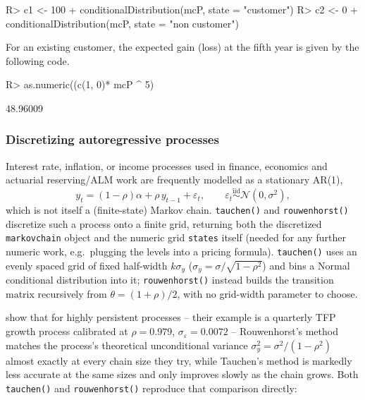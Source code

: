 \documentclass[
  nojss]{jss}
\begin{document}
\begin{CodeChunk}
\begin{CodeInput}
R> c1 <- 100 + conditionalDistribution(mcP, state = "customer") %
R> c2 <- 0 + conditionalDistribution(mcP, state = "non customer") %
\end{CodeInput}
\end{CodeChunk}

For an existing customer, the expected gain (loss) at the fifth year is given by the following code.

\begin{CodeChunk}
\begin{CodeInput}
R> as.numeric((c(1, 0)* mcP ^ 5) %
\end{CodeInput}
\begin{CodeOutput}
[1] 48.96009
\end{CodeOutput}
\end{CodeChunk}

\subsubsection{Discretizing autoregressive processes}\label{discretizing-autoregressive-processes}

Interest rate, inflation, or income processes used in finance, economics
and actuarial reserving/ALM work are frequently modelled as a stationary
AR(1),
\[
y_t = (1-\rho)\alpha + \rho\, y_{t-1} + \varepsilon_t, \qquad
\varepsilon_t \overset{\mathrm{iid}}{\sim} \mathcal N(0,\sigma^2),
\]
which is not itself a (finite-state) Markov chain. \texttt{tauchen()} and
\texttt{rouwenhorst()} discretize such a process onto a finite grid, returning both
the discretized \texttt{markovchain} object and the numeric grid \texttt{states} itself
(needed for any further numeric work, e.g.~plugging the levels into a
pricing formula). \texttt{tauchen()} \citep{tauchen1986} uses an evenly spaced grid
of fixed half-width \(k\sigma_y\) (\(\sigma_y=\sigma/\sqrt{1-\rho^2}\)) and bins
a Normal conditional distribution into it; \texttt{rouwenhorst()}
\citep{rouwenhorst1995} instead builds the transition matrix recursively
from \(\theta=(1+\rho)/2\), with no grid-width parameter to choose.

\cite{kopeckySuen2010} show that for highly persistent
processes -- their example is a quarterly TFP growth process calibrated at
\(\rho=0.979\), \(\sigma_\varepsilon=0.0072\) -- Rouwenhorst's method matches
the process's theoretical unconditional variance
\(\sigma_y^2=\sigma^2/(1-\rho^2)\) almost exactly at every chain size they
try, while Tauchen's method is markedly less accurate at the same sizes and
only improves slowly as the chain grows. Both \texttt{tauchen()} and
\texttt{rouwenhorst()} reproduce that comparison directly:
\end{document}
